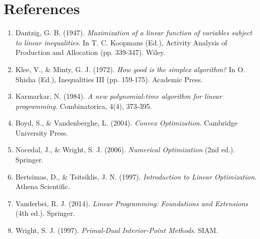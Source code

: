 \documentclass[11pt]{article}
\begin{document}
\section*{References}

\begin{enumerate}
    \item Dantzig, G. B. (1947). \textit{Maximization of a linear function of variables subject to linear inequalities}. In T. C. Koopmans (Ed.), Activity Analysis of Production and Allocation (pp. 339-347). Wiley.
    
    \item Klee, V., \& Minty, G. J. (1972). \textit{How good is the simplex algorithm?} In O. Shisha (Ed.), Inequalities III (pp. 159-175). Academic Press.
    
    \item Karmarkar, N. (1984). \textit{A new polynomial-time algorithm for linear programming}. Combinatorica, 4(4), 373-395.
    
    \item Boyd, S., \& Vandenberghe, L. (2004). \textit{Convex Optimization}. Cambridge University Press.
    
    \item Nocedal, J., \& Wright, S. J. (2006). \textit{Numerical Optimization} (2nd ed.). Springer.
    
    \item Bertsimas, D., \& Tsitsiklis, J. N. (1997). \textit{Introduction to Linear Optimization}. Athena Scientific.
    
    \item Vanderbei, R. J. (2014). \textit{Linear Programming: Foundations and Extensions} (4th ed.). Springer.
    
    \item Wright, S. J. (1997). \textit{Primal-Dual Interior-Point Methods}. SIAM.
\end{enumerate}
\end{document}
